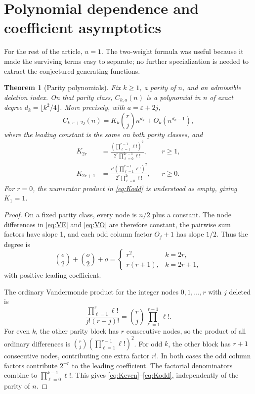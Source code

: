 \documentclass[11pt,letterpaper]{article}
\numberwithin{equation}{section}
\newtheorem{theorem}{Theorem}[section]
\theoremstyle{definition}
\newcommand{\eps}{\varepsilon}
\begin{document}
\section{Polynomial dependence and coefficient asymptotics}\label{sec:poly}
For the rest of the article, \(u=1\). The two-weight formula was useful
because it made the surviving terms easy to separate; no further
specialization is needed to extract the conjectured generating functions.

\begin{theorem}[Parity polynomials]\label{thm:parity}
Fix \(k\ge1\), a parity of \(n\), and an admissible deletion index.
On that parity class, \(C_{k,a}(n)\) is a polynomial in \(n\) of exact
degree \(d_k=\lfloor k^2/4\rfloor\). More precisely, with
\(a=\eps+2j\),
\begin{equation}\label{eq:leading}
 C_{k,\eps+2j}(n)
 =K_k\binom rj n^{d_k}+O_k(n^{d_k-1}),
\end{equation}
where the leading constant is the same on both parity classes, and
\begin{align}
 K_{2r}&=
 \frac{\displaystyle\left(\prod_{\ell=1}^{r-1}\ell!\right)^2}
 {\displaystyle 2^r\prod_{\ell=0}^{2r-1}\ell!},
 &&r\ge1,\label{eq:Keven}\\
 K_{2r+1}&=
 \frac{\displaystyle r!\left(\prod_{\ell=1}^{r-1}\ell!\right)^2}
 {\displaystyle 2^r\prod_{\ell=0}^{2r}\ell!},
 &&r\ge0.\label{eq:Kodd}
\end{align}
For \(r=0\), the numerator product in \eqref{eq:Kodd} is understood
as empty, giving \(K_1=1\).
\end{theorem}
\begin{proof}
On a fixed parity class, every node is \(n/2\) plus a constant.
The node differences in \eqref{eq:VE} and \eqref{eq:VO} are therefore
constant, the pairwise sum factors have slope 1, and each odd column
factor \(O_j+1\) has slope \(1/2\). Thus the degree is
\[
 \binom e2+\binom o2+o
 =\begin{cases}r^2,&k=2r,\\r(r+1),&k=2r+1,\end{cases}
\]
with positive leading coefficient.

The ordinary Vandermonde product for the integer nodes \(0,1,\ldots,r\)
with \(j\) deleted is
\[
 \frac{\prod_{\ell=1}^{r}\ell!}{j!(r-j)!}
 =\binom rj\prod_{\ell=1}^{r-1}\ell!.
\]
For even \(k\), the other parity block has \(r\) consecutive nodes,
so the product of all ordinary differences is
\(\binom rj(\prod_{\ell=1}^{r-1}\ell!)^2\).
For odd \(k\), the other block has \(r+1\) consecutive nodes,
contributing one extra factor \(r!\). In both cases the odd column
factors contribute \(2^{-r}\) to the leading coefficient. The
factorial denominators combine to
\(\prod_{\ell=0}^{k-1}\ell!\). This gives
\eqref{eq:Keven}--\eqref{eq:Kodd}, independently of the parity of \(n\).
\end{proof}
\end{document}
